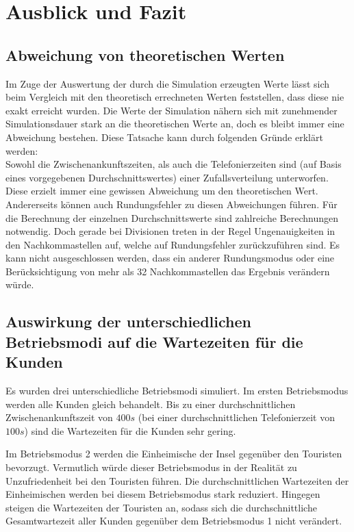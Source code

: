 \section{Ausblick und Fazit}
\subsection{Abweichung von theoretischen Werten}
Im Zuge der Auswertung der durch die Simulation erzeugten Werte lässt sich beim Vergleich mit den theoretisch errechneten Werten feststellen, dass diese nie exakt erreicht wurden. Die Werte der Simulation nähern sich mit zunehmender Simulationsdauer stark an die theoretischen Werte an, doch es bleibt immer eine Abweichung bestehen. Diese Tatsache kann durch folgenden Gründe erklärt werden: \\

Sowohl die Zwischenankunftszeiten, als auch die Telefonierzeiten sind (auf Basis eines vorgegebenen Durchschnittswertes) einer Zufallsverteilung unterworfen. Diese erzielt immer eine gewissen Abweichung um den theoretischen Wert. \\

Andererseits können auch Rundungsfehler zu diesen Abweichungen führen. Für die Berechnung der einzelnen Durchschnittswerte sind zahlreiche Berechnungen notwendig. Doch gerade bei Divisionen treten in der Regel Ungenauigkeiten in den Nachkommastellen auf, welche auf Rundungsfehler zurückzuführen sind. Es kann nicht ausgeschlossen werden, dass ein anderer Rundungsmodus oder eine Berücksichtigung von mehr als 32 Nachkommastellen das Ergebnis verändern würde.\\

\subsection{Auswirkung der unterschiedlichen Betriebsmodi auf die Wartezeiten für die Kunden}
Es wurden drei unterschiedliche Betriebsmodi simuliert. Im ersten Betriebsmodus werden alle Kunden gleich behandelt. Bis zu einer durchschnittlichen Zwischenankunftszeit von $400s$ (bei einer durchschnittlichen Telefonierzeit von $100s$) sind die Wartezeiten für die Kunden sehr gering.

Im Betriebsmodus 2 werden die Einheimische der Insel gegenüber den Touristen bevorzugt. Vermutlich würde dieser Betriebsmodus in der Realität zu Unzufriedenheit bei den Touristen führen. Die durchschnittlichen Wartezeiten der Einheimischen werden bei diesem Betriebsmodus stark reduziert. Hingegen steigen die Wartezeiten der Touristen an, sodass sich die durchschnittliche Gesamtwartezeit aller Kunden gegenüber dem Betriebsmodus 1 nicht verändert.

